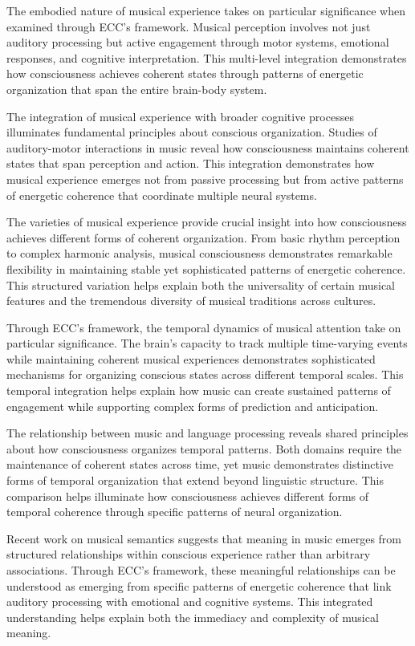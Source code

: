 \begin{refsection}
The embodied nature of musical experience \cite{Reybrouck2005} takes on particular significance when examined through ECC's framework. Musical perception involves not just auditory processing but active engagement through motor systems, emotional responses, and cognitive interpretation. This multi-level integration demonstrates how consciousness achieves coherent states through patterns of energetic organization that span the entire brain-body system.

The integration of musical experience with broader cognitive processes illuminates fundamental principles about conscious organization. Studies of auditory-motor interactions in music \cite{Zatorre2007} reveal how consciousness maintains coherent states that span perception and action. This integration demonstrates how musical experience emerges not from passive processing but from active patterns of energetic coherence that coordinate multiple neural systems.

The varieties of musical experience \cite{Bharucha2006} provide crucial insight into how consciousness achieves different forms of coherent organization. From basic rhythm perception to complex harmonic analysis, musical consciousness demonstrates remarkable flexibility in maintaining stable yet sophisticated patterns of energetic coherence. This structured variation helps explain both the universality of certain musical features and the tremendous diversity of musical traditions across cultures.

Through ECC's framework, the temporal dynamics of musical attention \cite{Large1999} take on particular significance. The brain's capacity to track multiple time-varying events while maintaining coherent musical experiences demonstrates sophisticated mechanisms for organizing conscious states across different temporal scales. This temporal integration helps explain how music can create sustained patterns of engagement while supporting complex forms of prediction and anticipation.

The relationship between music and language processing \cite{Patel2010} reveals shared principles about how consciousness organizes temporal patterns. Both domains require the maintenance of coherent states across time, yet music demonstrates distinctive forms of temporal organization that extend beyond linguistic structure. This comparison helps illuminate how consciousness achieves different forms of temporal coherence through specific patterns of neural organization.

Recent work on musical semantics \cite{Reybrouck2005} suggests that meaning in music emerges from structured relationships within conscious experience rather than arbitrary associations. Through ECC's framework, these meaningful relationships can be understood as emerging from specific patterns of energetic coherence that link auditory processing with emotional and cognitive systems. This integrated understanding helps explain both the immediacy and complexity of musical meaning.


\end{refsection}
